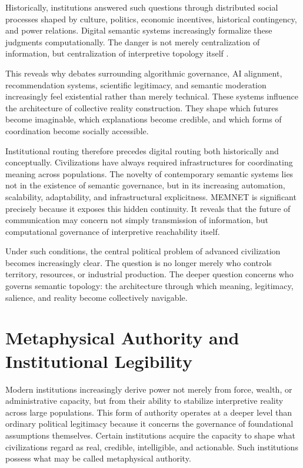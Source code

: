 \documentclass[11pt,a4paper]{article}
\begin{document}
Historically, institutions answered such questions through distributed social processes shaped by culture, politics, economic incentives, historical contingency, and power relations. Digital semantic systems increasingly formalize these judgments computationally. The danger is not merely centralization of information, but centralization of interpretive topology itself \cite{pasquale2015}.

This reveals why debates surrounding algorithmic governance, AI alignment, recommendation systems, scientific legitimacy, and semantic moderation increasingly feel existential rather than merely technical. These systems influence the architecture of collective reality construction. They shape which futures become imaginable, which explanations become credible, and which forms of coordination become socially accessible.

Institutional routing therefore precedes digital routing both historically and conceptually. Civilizations have always required infrastructures for coordinating meaning across populations. The novelty of contemporary semantic systems lies not in the existence of semantic governance, but in its increasing automation, scalability, adaptability, and infrastructural explicitness. MEMNET is significant precisely because it exposes this hidden continuity. It reveals that the future of communication may concern not simply transmission of information, but computational governance of interpretive reachability itself.

Under such conditions, the central political problem of advanced civilization becomes increasingly clear. The question is no longer merely who controls territory, resources, or industrial production. The deeper question concerns who governs semantic topology: the architecture through which meaning, legitimacy, salience, and reality become collectively navigable.

\section{Metaphysical Authority and Institutional Legibility}

Modern institutions increasingly derive power not merely from force, wealth, or administrative capacity, but from their ability to stabilize interpretive reality across large populations. This form of authority operates at a deeper level than ordinary political legitimacy because it concerns the governance of foundational assumptions themselves. Certain institutions acquire the capacity to shape what civilizations regard as real, credible, intelligible, and actionable. Such institutions possess what may be called metaphysical authority.
\end{document}
